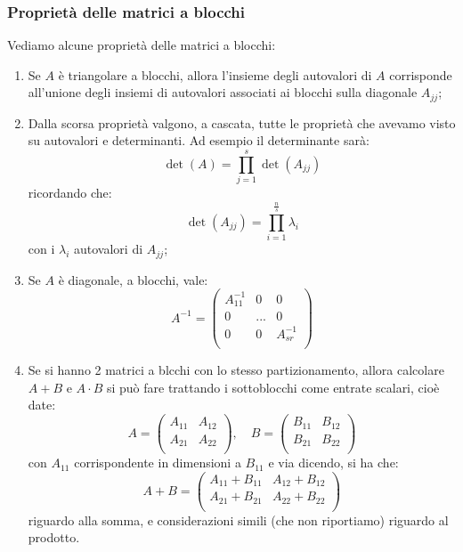 \documentclass[a4paper,11pt]{article}
\begin{document}
\subsubsection{Proprietà delle matrici a blocchi}
Vediamo alcune proprietà delle matrici a blocchi:
\begin{enumerate}
	\item Se $A$ è triangolare a blocchi, allora l'insieme degli autovalori di $A$ corrisponde all'unione degli insiemi di autovalori associati ai blocchi sulla diagonale $A_{jj}$;

	\item Dalla scorsa proprietà valgono, a cascata, tutte le proprietà che avevamo visto su autovalori e determinanti.
		Ad esempio il determinante sarà:
		$$
		\det(A) = \prod_{j=1}^s \det(A_{jj})
		$$
		ricordando che:
		$$
		\det(A_{jj}) = \prod_{i=1}^{\frac{n}{s}} \lambda_i
		$$
		con i $\lambda_i$ autovalori di $A_{jj}$;

	\item Se $A$ è diagonale, a blocchi, vale:
		$$
		A^{-1} = \begin{pmatrix}
			A_{11}^{-1} & 0 & 0 \\
	0 & ... & 0 \\
	0 & 0 & A_{sr}^{-1} \\
\end{pmatrix} 
		$$

	\item Se si hanno 2 matrici a blcchi con lo stesso partizionamento, allora calcolare $A + B$ e $A\cdot B$ si può fare trattando i sottoblocchi come entrate scalari, cioè date:
		$$
		 A = \begin{pmatrix}
		 	A_{11} & A_{12} \\
		 	A_{21} & A_{22} \\
		 \end{pmatrix}, \quad B = \begin{pmatrix}
		 	B_{11} & B_{12} \\
		 	B_{21} & B_{22} \\
		 \end{pmatrix}
		$$
		con $A_{11}$ corrispondente in dimensioni a $B_{11}$ e via dicendo, si ha che:
		$$
			A + B = \begin{pmatrix}
				A_{11} + B_{11} & A_{12} + B_{12} \\
				A_{21} + B_{21} & A_{22} + B_{22} \\
			\end{pmatrix}
		$$
		riguardo alla somma, e considerazioni simili (che non riportiamo) riguardo al prodotto.
\end{enumerate}
\end{document}
